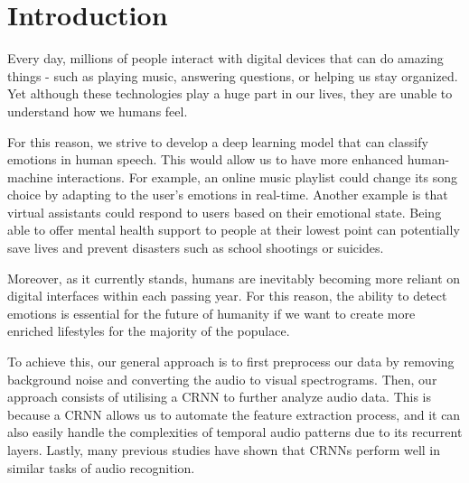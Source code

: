 \documentclass[../main.tex]{subfiles}
\begin{document}
\section{Introduction}
Every day, millions of people interact with digital devices that can do amazing 
things - such as playing music, answering questions, or helping us stay organized. 
Yet although these technologies play a huge part in our lives, they are unable to 
understand how we humans feel. 

For this reason, we strive to develop a deep learning model that can classify 
emotions in human speech. This would allow us to have more enhanced 
human-machine interactions. For example, an online music playlist could 
change its song choice by adapting to the user's emotions in real-time. Another 
example is that virtual assistants could respond to users based on their 
emotional state. Being able to offer mental health support to people at their 
lowest point can potentially save lives and prevent disasters such as school 
shootings or suicides.

Moreover, as it currently stands, humans are inevitably becoming more reliant on 
digital interfaces within each passing year. For this reason, the ability to
detect emotions is essential for the future of humanity if we want to create
more enriched lifestyles for the majority of the populace.

To achieve this, our general approach is to first preprocess our data by removing
background noise and converting the audio to visual spectrograms. Then, our approach
consists of utilising a CRNN to further analyze audio data. This is because a CRNN
allows us to automate the feature extraction process, and it can also easily handle
the complexities of temporal audio patterns due to its recurrent layers. Lastly,
many previous studies have shown that CRNNs perform well in similar tasks of audio
recognition.
\end{document}
